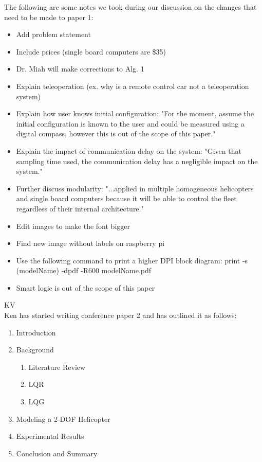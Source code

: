 \documentclass[fontsize=11pt, %
                             paper=letter, %
                             openany, %
                             captions=tableheading,
                             index=totoc,
                             hyperref]{labbook}
\begin{document}
\begin{addmargin}[0cm]{0cm}
The following are some notes we took during our discussion on the changes that need to be made to paper 1:
\begin{itemize}
    \item Add problem statement
    \item Include prices (single board computers are \$35)
    \item Dr. Miah will make corrections to Alg. 1
    \item Explain teleoperation (ex. why is a remote control car not a teleoperation system)
    \item Explain how user knows initial configuration: "For the moment, assume the initial configuration is known to the user and could be measured using a digital compass, however this is out of the scope of this paper."
    \item Explain the impact of communication delay on the system: "Given that sampling time used, the communication delay has a negligible impact on the system."
    \item Further discuss modularity: "...applied in multiple homogeneous helicopters and single board computers because it will be able to control the fleet regardless of their internal architecture."
    \item Edit images to make the font bigger
    \item Find new image without labels on raspberry pi
    \item Use the following command to print a higher DPI block diagram: print -s (modelName) -dpdf -R600 modelName.pdf
    \item Smart logic is out of the scope of this paper
\end{itemize}

KV\\
Ken has started writing conference paper 2 and has outlined it as follows:
\begin{enumerate}
    \item Introduction
    \item Background
    \begin{enumerate}
        \item Literature Review
        \item LQR
        \item LQG
    \end{enumerate}
    \item Modeling a 2-DOF Helicopter
    \item Experimental Results
    \item Conclusion and Summary
\end{enumerate}


\end{addmargin}
\end{document}
